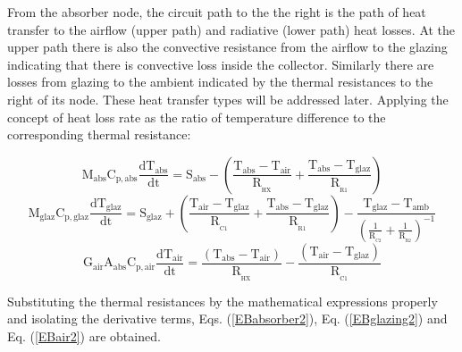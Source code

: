 From the absorber node, the circuit path to the the right is the path of heat transfer to the airflow (upper path) and radiative (lower path) heat losses. At the upper path there is also the convective resistance from the airflow to the glazing indicating that there is convective loss inside the collector. Similarly there are losses from glazing to the ambient indicated by the thermal resistances to the right of its node. These heat transfer types will be addressed later. Applying the concept of heat loss rate as the ratio of temperature difference to the corresponding thermal resistance:

%

\vspace{-0.75cm}
\begin{equation}
\mathrm{{M_{abs}}{C_{p,abs}}\frac{{d{T_{abs}}}}{{dt}} = {S_{abs}} - \left( {\frac{{{T_{abs}} - {T_{air}}}}{R_{\!_{HX}}} + \frac{{{T_{abs}} - {T_{glaz}}}}{R_{\!_{R1}}}} \right) }
\label{eqabsorber1}
\end{equation}
\vspace*{-0.25cm}
\begin{equation}
\mathrm{{M_{glaz}}{C_{p,glaz}}\frac{{d{T_{glaz}}}}{{dt}} = {S_{glaz}} + \left( {\frac{{{T_{air}} - {T_{glaz}}}}{R_{\!_{C1}}} + \frac{{{T_{abs}} - {T_{glaz}}}}{R_{\!_{R1}}}} \right) - \frac{{{T_{glaz}} - {T_{amb}}}}{{{\displaystyle{\left( {\frac{1}{{{R_{\!_{C2}}}}} + \frac{1}{{{R_{\!_{R2}}}}}} \right)}^{-1}}}}}
\label{eqglazing1}
\end{equation}
\vspace*{-0.25cm}
\begin{equation}
	\mathrm{G_{air}A_{abs}C_{p,air}\frac{dT_{air}}{dt} = \frac{(T_{abs} - T_{air})}{R_{\!_{HX}}} - \frac{(T_{air} - T_{glaz})}{R_{\!_{C1}}}}
	\label{EBair1}
\end{equation}

Substituting the thermal resistances by the mathematical expressions properly and isolating the derivative terms, Eqs. (\ref{EBabsorber2}), Eq. (\ref{EBglazing2}) and Eq. (\ref{EBair2}) are obtained.

